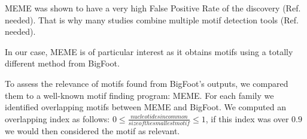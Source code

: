 MEME was shown to have a very high False Positive Rate of the discovery (Ref. needed). That is why many studies combine multiple motif detection tools (Ref. needed).

In our case, MEME is of particular interest as it obtains motifs using a totally different method from BigFoot.

To assess the relevance of motifs found from BigFoot's outputs, we compared them to a well-known motif finding program: MEME. For each family we identified overlapping motifs between MEME and BigFoot. We computed an overlapping index as follows: $0 \leq \frac{nucleotides in common}{size of the smallest motif} \leq 1$, if this index was over $0.9$ we would then considered the motif as relevant.